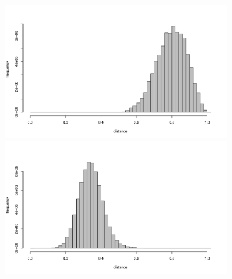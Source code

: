 \documentclass[]{revtex4}\usepackage[]{graphicx}\usepackage[]{color}
\newenvironment{knitrout}{}{} %
\begin{document}
\begin{knitrout}
{\centering \includegraphics[width=10cm]{figure/plotget_distances-1} 
\includegraphics[width=10cm]{figure/plotget_distances-2} 

}



\end{knitrout}
\end{document}
